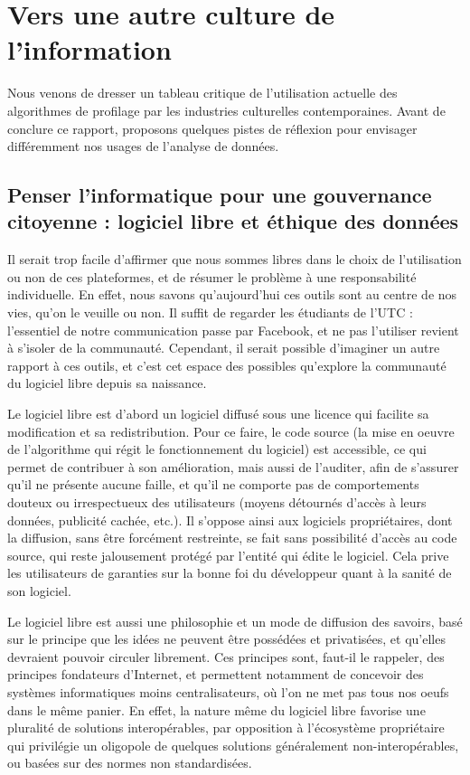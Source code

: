 \documentclass[a4paper,14pt]{extreport}
\begin{document}
\chapter{Vers une autre culture de l'information}

Nous venons de dresser un tableau critique de l'utilisation actuelle des algorithmes de profilage par les industries culturelles contemporaines. Avant de conclure ce rapport, proposons quelques pistes de réflexion pour envisager différemment nos usages de l'analyse de données.

\section{Penser l'informatique pour une gouvernance citoyenne : logiciel libre et éthique des données}

Il serait trop facile d'affirmer que nous sommes libres dans le choix de l'utilisation ou non de ces plateformes, et de résumer le problème à une responsabilité individuelle. En effet, nous savons qu'aujourd'hui ces outils sont au centre de nos vies, qu'on le veuille ou non. Il suffit de regarder les étudiants de l'UTC : l'essentiel de notre communication passe par Facebook, et ne pas l'utiliser revient à s'isoler de la communauté. Cependant, il serait possible d'imaginer un autre rapport à ces outils, et c'est cet espace des possibles qu'explore la communauté du logiciel libre depuis sa naissance.

Le logiciel libre est d'abord un logiciel diffusé sous une licence qui facilite sa modification et sa redistribution. Pour ce faire, le code source (la mise en oeuvre de l'algorithme qui régit le fonctionnement du logiciel) est accessible, ce qui permet de contribuer à son amélioration, mais aussi de l'auditer, afin de s'assurer qu'il ne présente aucune faille, et qu'il ne comporte pas de comportements douteux ou irrespectueux des utilisateurs (moyens détournés d'accès à leurs données, publicité cachée, etc.). Il s'oppose ainsi aux logiciels propriétaires, dont la diffusion, sans être forcément restreinte, se fait sans possibilité d'accès au code source, qui reste jalousement protégé par l'entité qui édite le logiciel. Cela prive les utilisateurs de garanties sur la bonne foi du développeur quant à la sanité de son logiciel.

Le logiciel libre est aussi une philosophie et un mode de diffusion des savoirs, basé sur le principe que les idées ne peuvent être possédées et privatisées, et qu'elles devraient pouvoir circuler librement. Ces principes sont, faut-il le rappeler, des principes fondateurs d'Internet, et permettent notamment de concevoir des systèmes informatiques moins centralisateurs, où l'on ne met pas tous nos oeufs dans le même panier. En effet, la nature même du logiciel libre favorise une pluralité de solutions interopérables, par opposition à l'écosystème propriétaire qui privilégie un oligopole de quelques solutions généralement non-interopérables, ou basées sur des normes non standardisées.
\end{document}

